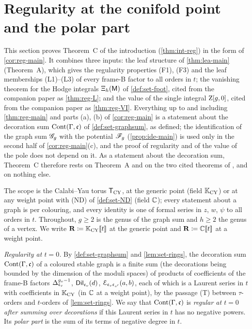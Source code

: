\providecommand{\regbra}[2]{\langle #1\mid #2\rangle}      %
\providecommand{\regD}{\dg}                                  %
\section{Regularity at the conifold point and the polar part}
\label{sec:reg}

This section proves Theorem~C of the introduction (\cref{thm:int-reg}) in the form of \cref{cor:reg-main}. It combines three inputs: the leaf structure of \cref{thm:lea-main} (Theorem~A), which gives the regularity properties (F1), (F3) and the leaf memberships (L1)--(L3) of every frame-B factor to all orders in $t$; the vanishing theorem for the Hodge integrals $\Xi_h(\mathsf{M})$ of \cref{def:set-fpot}, cited from the companion paper as \cref{thm:reg-L}; and the value of the single integral $\mathrm{Z}[g,0]$, cited from the companion paper as \cref{thm:reg-VI}. Everything up to and including \cref{thm:reg-main} and parts (a), (b) of \cref{cor:reg-main} is a statement about the decoration sum $\mathrm{Cont}(\Gamma,\mathfrak{c})$ of \cref{def:set-graphsum}, as defined; the identification of the graph sum $\mathscr{G}_g$ with the potential $\mathscr{F}_g$ (\cref{prop:ide-main}) is used only in the second half of \cref{cor:reg-main}(c), and the proof of regularity and of the value of the pole does not depend on it. As a statement about the decoration sum, Theorem~C therefore rests on Theorem~A and on the two cited theorems of \cite{LP2}, and on nothing else.

The scope is the Calabi--Yau torus $\mathsf{T}_{\mathrm{CY}}$, at the generic point (field $\mathbb{K}_{\mathrm{CY}}$) or at any weight point with (ND) of \cref{def:set-ND} (field $\mathbb{C}$); every statement about a graph is per colouring, and every identity is one of formal series in $z$, $w$, $\psi$ to all orders in $t$. Throughout, $g\geq 2$ is the genus of the graph sum and $h\geq 2$ the genus of a vertex. We write $\mathbf{R}\coloneqq\mathbb{K}_{\mathrm{CY}}[\![ t ]\!]$ at the generic point and $\mathbf{R}\coloneqq\mathbb{C}[\![ t ]\!]$ at a weight point.

\emph{Regularity at $t=0$.} By \cref{def:set-graphsum} and \cref{lem:set-rings}, the decoration sum $\mathrm{Cont}(\Gamma,\mathfrak{c})$ of a coloured stable graph is a finite sum (the decorations being bounded by the dimension of the moduli spaces) of products of coefficients of the frame-B factors $\Delta_{\mathfrak{c}_v}^{g_v-1}$, $\mathsf{Dil}_{\mathfrak{c}_v}(d)$, $\mathcal{E}_{\mathfrak{c}_v\mathfrak{c}_{v'}}(a,b)$, each of which is a Laurent series in $t$ with coefficients in $\mathbb{K}_{\mathrm{CY}}$ (in $\mathbb{C}$ at a weight point), by the passage (T) between $\tau$-orders and $t$-orders of \cref{lem:set-rings}. We say that $\mathrm{Cont}(\Gamma,\mathfrak{c})$ is \emph{regular at $t=0$ after summing over decorations} if this Laurent series in $t$ has no negative powers. Its \emph{polar part} is the sum of its terms of negative degree in $t$.

